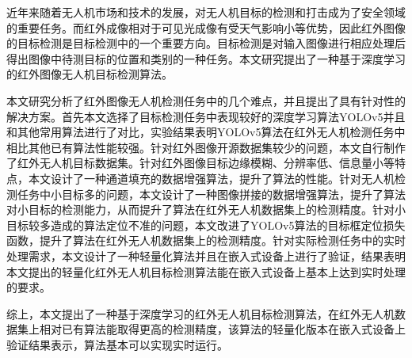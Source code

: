 \begin{cabstract}
近年来随着无人机市场和技术的发展，对无人机目标的检测和打击成为了安全领域的重要任务。而红外成像相对于可见光成像有受天气影响小等优势，因此红外图像的目标检测是目标检测中的一个重要方向。目标检测是对输入图像进行相应处理后得出图像中待测目标的位置和类别的一种任务。本文研究提出了一种基于深度学习的红外图像无人机目标检测算法。

本文研究分析了红外图像无人机检测任务中的几个难点，并且提出了具有针对性的解决方案。首先本文选择了目标检测任务中表现较好的深度学习算法YOLOv5并且和其他常用算法进行了对比，实验结果表明YOLOv5算法在红外无人机检测任务中相比其他已有算法性能较强。针对红外图像开源数据集较少的问题，本文自行制作了红外无人机目标数据集。针对红外图像目标边缘模糊、分辨率低、信息量小等特点，本文设计了一种通道填充的数据增强算法，提升了算法的性能。针对无人机检测任务中小目标多的问题，本文设计了一种图像拼接的数据增强算法，提升了算法对小目标的检测能力，从而提升了算法在红外无人机数据集上的检测精度。针对小目标较多造成的算法定位不准的问题，本文改进了YOLOv5算法的目标框定位损失函数，提升了算法在红外无人机数据集上的检测精度。针对实际检测任务中的实时处理需求，本文设计了一种轻量化算法并且在嵌入式设备上进行了验证，结果表明本文提出的轻量化红外无人机目标检测算法能在嵌入式设备上基本上达到实时处理的要求。

综上，本文提出了一种基于深度学习的红外无人机目标检测算法，在红外无人机数据集上相对已有算法能取得更高的检测精度，该算法的轻量化版本在嵌入式设备上验证结果表示，算法基本可以实现实时运行。
\end{cabstract}


